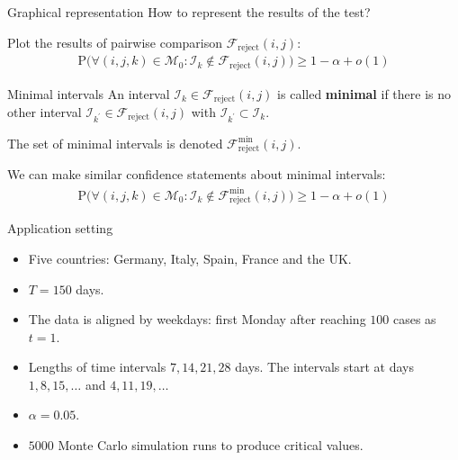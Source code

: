 \documentclass[10pt, handout]{beamer}
\newcommand{\Prob}{\mathrm{P}}
\begin{document}
\begin{frame}{Graphical representation}
How to represent the results of the test? \pause

Plot the results of pairwise comparison $\mathcal{F}_{\text{reject}}(i, j)$:
\begin{align*}
 \Prob\Big( \forall (i,j,k) \in \mathcal{M}_0: \mathcal{I}_k \notin \mathcal{F}_{\text{reject}}(i, j) \Big) \ge 1 - \alpha + o(1)
\end{align*}

\pause
\begin{block}{Minimal intervals}
An interval $\mathcal{I}_k \in \mathcal{F}_{\text{reject}}(i, j)$ is called \textbf{minimal} if there is no other interval $\mathcal{I}_{k^\prime} \in \mathcal{F}_{\text{reject}}(i, j)$ with $\mathcal{I}_{k^\prime} \subset \mathcal{I}_k$.

The set of minimal intervals is denoted $\mathcal{F}_{\text{reject}}^{\min} (i, j)$.
\end{block}\pause
We can make similar confidence statements about minimal intervals:
\begin{align*}
 \Prob\Big( \forall (i,j,k) \in \mathcal{M}_0: \mathcal{I}_k \notin \mathcal{F}_{\text{reject}}^{\min} (i, j) \Big) \ge 1 - \alpha + o(1)
\end{align*}
\end{frame}

\begin{frame}{Application setting}
\begin{itemize}
\item Five countries: Germany, Italy, Spain, France and the UK.
\item $T = 150$ days. 
\item The data is aligned by weekdays: first Monday after reaching $100$ cases as $t=1$.
\item Lengths of time intervals $7, 14, 21, 28$ days. The intervals start at days $1, 8, 15, \ldots$ and $4, 11, 19, \ldots$
\item $\alpha = 0.05$.
\item $5000$ Monte Carlo simulation runs to produce critical values.
\end{itemize}
\end{frame}
\end{document}
